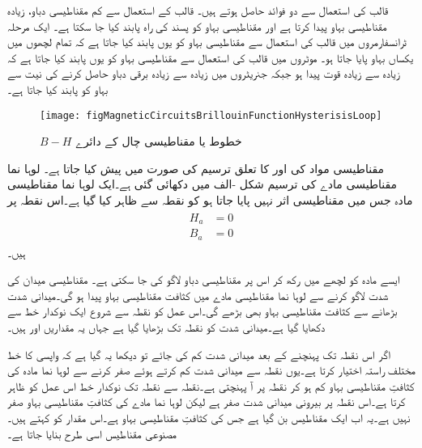 قالب کی استعمال سے دو فوائد حاصل ہوتے ہیں۔ قالب کے استعمال سے کم مقناطیسی دباو، زیادہ مقناطیسی بہاو پیدا کرتا ہے اور مقناطیسی بہاو کو پسند کی راہ پابند کیا جا سکتا ہے۔ ایک مرحلہ ٹرانسفارمروں میں قالب کی استعمال سے مقناطیسی بہاو کو یوں پابند کیا جاتا ہے کہ تمام لچھوں میں یکساں بہاو پایا جاتا ہو۔ موٹروں میں قالب کی استعمال سے مقناطیسی بہاو کو یوں پابند کیا جاتا ہے کہ زیادہ سے زیادہ قوت پیدا ہو جبکہ جنریٹروں میں زیادہ سے زیادہ برقی دباو حاصل کرنے کی نیت سے بہاو کو پابند کیا جاتا ہے۔
\begin{figure}
\centering
\texttt{[image: figMagneticCircuitsBrillouinFunctionHysterisisLoop]}
\caption{$B-H$   خطوط یا مقناطیسی چال کے دائرے}
\label{شکل_مقناطیسی_چال}
\end{figure}
مقناطیسی مواد کی  اور  کا تعلق  ترسیم کی صورت میں پیش کیا جاتا ہے۔ لوہا نما مقناطیسی مادے کی   ترسیم شکل -الف میں دکھائی گئی ہے۔ایک لوہا نما مقناطیسی مادہ جس میں  مقناطیسی اثر نہیں پایا جاتا ہو کو نقطہ  سے ظاہر کیا گیا ہے۔اس نقطہ پر
\begin{gather}
\begin{aligned}
H_a&=0\\
B_a&=0
\end{aligned}
\end{gather}
ہیں۔

	ایسے مادہ کو لچھے میں رکھ کر اس پر مقناطیسی دباو لاگو کی جا سکتی ہے۔ مقناطیسی میدان کی شدت   لاگو کرنے سے لوہا نما مقناطیسی مادے میں کثافت مقناطیسی بہاو   پیدا ہو گی۔میدانی شدت بڑھانے سے کثافت مقناطیسی بہاو بھی بڑھے گی۔اس عمل کو نقطہ   سے شروع ایک نوکدار خط سے دکھایا گیا ہے۔میدانی شدت کو نقطہ   تک بڑھایا گیا ہے جہاں یہ مقداریں   اور  ہیں۔

	اگر اس نقطہ تک پہنچنے کے بعد میدانی شدت کم کی جائے تو دیکھا یہ گیا ہے کہ واپسی کا خط مختلف راستہ اختیار کرتا ہے۔یوں نقطہ   سے میدانی شدت کم کرتے ہوئے صفر کرنے سے  لوہا نما مادہ کی کثافتِ مقناطیسی بہاو کم ہو کر نقطہ  پر آ پہنچتی ہے۔نقطہ  سے نقطہ  تک نوکدار خط اس عمل کو ظاہر کرتا ہے۔اس نقطہ پر بیرونی میدانی شدت صفر ہے لیکن لوہا نما مادے کی کثافتِ مقناطیسی بہاو صفر نہیں ہے۔یہ اب ایک مقناطیس بن گیا ہے جس کی کثافتِ مقناطیسی بہاو   ہے۔اس مقدار کو   کہتے ہیں۔مصنوعی مقناطیس اسی طرح بنایا جاتا ہے۔

